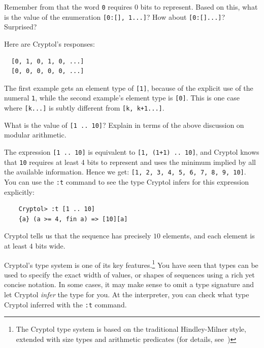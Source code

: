 \begin{Exercise}\label{ex:arith:9}
  Remember from  that the word \texttt{0}
  requires 0 bits to represent. Based on this, what is the value of
  the enumeration \texttt{[0:[\textunderscore], 1...]}? How about
  \texttt{[0:[\textunderscore]...]}? Surprised?
\end{Exercise}
\begin{Answer}
Here are Cryptol's responses:\indModular\indEnum\indInfSeq
\begin{Verbatim}
  [0, 1, 0, 1, 0, ...]
  [0, 0, 0, 0, 0, ...]
\end{Verbatim}
The first example gets an element type of \texttt{[1]}, because of the
explicit use of the numeral \texttt{1}, while the second example's
element type is \texttt{[0]}. This is one case where \texttt{[k...]}
is subtly different from \texttt{[k, k+1...]}.
\end{Answer}

\begin{Exercise}\label{ex:arith:10}
  What is the value of \texttt{[1 ..\ 10]}? Explain in terms of the above
  discussion on modular arithmetic.\indModular
\end{Exercise}
\begin{Answer}
  The expression \texttt{[1 ..\ 10]} is equivalent to \texttt{[1, (1+1) ..\ 10]},
  and Cryptol knows that \texttt{10} requires at least 4 bits
  to represent and uses the minimum implied by all the available
  information. Hence we get: \texttt{[1, 2, 3, 4, 5, 6, 7, 8, 9, 10]}.
  You can use the \texttt{:t} command to see the type Cryptol infers for
  this expression explicitly:
\begin{Verbatim}
    Cryptol> :t [1 .. 10]
    {a} (a >= 4, fin a) => [10][a]
\end{Verbatim}
Cryptol tells us that the sequence has precisely $10$ elements, and each
element is at least $4$ bits wide.
\end{Answer}


Cryptol's type system is one of its key features.\footnote{The Cryptol
  type system is based on the traditional Hindley-Milner style,
  extended with size types and arithmetic
  predicates (for details, see~\cite{erkok-carlsson-wick-cryptolCoverification-09,
    erkok-matthews-cryptolEqChecking-09, Hin97})}  You have seen that
types can be used to specify the exact width of values, or shapes of
sequences using a rich yet concise notation.  In some cases, it may
make sense to omit a type signature and let Cryptol {\em infer} the
type for you. At the interpreter, you can check what type Cryptol
inferred with the \texttt{:t} command.

